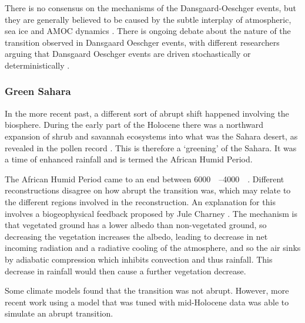 There is no consensus on the mechanisms of the Dansgaard-Oeschger events, but they are generally believed to be caused by the subtle interplay of atmospheric, sea ice and AMOC dynamics
\parencite{Vettoretti2022,Boers2018,Riechers2023arxiv}. There is ongoing debate about the nature of the transition observed in Dansgaard Oeschger events, with different researchers arguing
that Dansgaard Oeschger events are driven stochastically \parencite{Ditlevsen2010,Ditlevsen1999} or deterministically \parencite{Boers2018a}.

\subsubsection{Green Sahara}
In the more recent past, a different sort of abrupt shift happened involving the biosphere. During the early part of the Holocene there was a northward expansion of shrub and savannah ecosystems
into what was the Sahara desert, as revealed in the pollen record \parencite{Hoelzmann1998,Hely2014}. This is therefore a `greening' of the Sahara. It was a time of enhanced rainfall \parencite{Tierney2017}
and is termed the African Humid Period.

The African Humid Period came to an end between \SIrange{6000}{4000}{\year\beforepresent}. Different reconstructions \parencite{Shanahan2015,Kropelin2008} disagree on how abrupt the transition
was, which may relate to the different regions involved in the reconstruction. An explanation for this 
involves a biogeophysical feedback proposed by Jule Charney \parencite{Charney1975,Charney1975a}. The mechanism is that vegetated ground has a lower
albedo than non-vegetated ground, so decreasing the vegetation increases the albedo, leading to decrease in net incoming radiation and a radiative cooling of the atmosphere, and so the air sinks by adiabatic compression
which inhibits convection and thus rainfall. This decrease in rainfall would then cause a further vegetation decrease.

Some climate models \parencite{Renssen2006} found that the transition was not abrupt. However, more recent work \parencite{Hopcroft2021} using a model that was tuned with mid-Holocene data was able to simulate an abrupt
transition.


